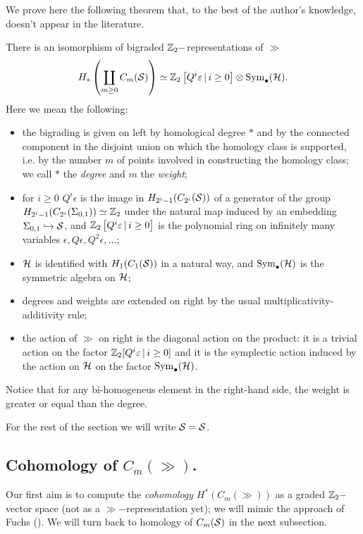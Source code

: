 We prove here the following theorem that, to the best of the author's knowledge, doesn't appear
in the literature.
\begin{thm}
 \label{thm:Hbms*as*ggrep}
 There is an isomorphism of bigraded $\Z_2-$representations of $\gg$
 \[
  H_*\pa{\coprod_{m\geq 0} C_m(\S)}\simeq \Z_2\left[Q^i\epsilon\,|\, i\geq 0\right]\otimes\Sym_{\bullet}(\H).
 \]
 Here we mean the following:
 \begin{itemize}
  \item the bigrading is given on left by homological degree $*$ and by the connected component
  in the disjoint union on which the homology class is supported, i.e. by the number $m$ of points
  involved in constructing the homology class; we call $*$ the \emph{degree} and $m$ the \emph{weight};
  \item for $i\geq 0$ $Q^i\epsilon$ is the image in $H_{2^i-1}(C_{2^i}(\S))$ of a generator
  of the group $H_{2^i-1}(C_{2^i}(\Sigma_{0,1}))\simeq \Z_2$ 
  under the natural map induced by an embedding $\Sigma_{0,1}\hookrightarrow\S$,
  and $\Z_2\left[Q^i\epsilon\,|\, i\geq 0\right]$ is the polynomial ring on
  infinitely many variables $\epsilon,Q\epsilon,Q^2\epsilon,\dots$;
  \item $\H$ is identified with $H_1(C_1(\S))$ in a natural way, and $\Sym_{\bullet}(\H)$ is the
  symmetric algebra on $\H$;
  \item degrees and weights are extended on right by the usual multiplicativity-additivity rule;
  \item the action of $\gg$ on right is the diagonal action on the product: it is a trivial action
  on the factor $\Z_2[Q^i\epsilon\,|\, i\geq 0]$ and it is the symplectic action induced by the action on $\H$ on the
  factor $\Sym_{\bullet}(\H)$.
  \end{itemize}
  
  Notice that for any bi-homogeneus element in the right-hand side, the weight is greater or equal than
  the degree.
\end{thm}
For the rest of the section we will write $\S=\S$.

\subsection{Cohomology of $C_m(\gg)$.} Our first aim is to compute the \emph{cohomology} $H^*(C_m(\gg))$ as a graded
$\Z_2-$vector space (not as a $\gg-$representation yet); we will mimic the approach of Fuchs (\cite{Fuchs:CohomBraidModtwo}).
We will turn back to homology of $\cms$ in the next subsection.

